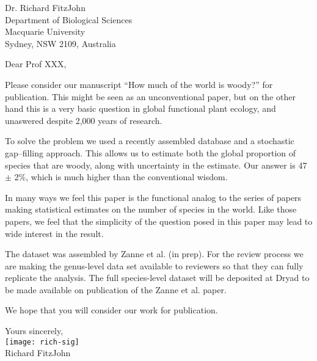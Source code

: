 \documentclass[a4paper,12pt]{article}
\begin{document}
{\raggedleft
  Dr. Richard FitzJohn\\
  Department of Biological Sciences\\
  Macquarie University\\
  Sydney, NSW 2109, Australia\\[2ex]
}

\vspace{3ex}

Dear Prof XXX,

Please consider our manuscript ``How much of the world is woody?''
for publication.  This might be seen as an unconventional paper, but
on the other hand this is a very basic question in global functional
plant ecology, and unaswered despite 2,000 years of research.

To solve the problem we used a recently assembled database and a
stochastic gap--filling approach.  This allows us to estimate both the
global proportion of species that are woody, along with uncertainty in
the estimate.  Our answer is 47 $\pm$ 2\%, which is much higher than
the conventional wisdom.

In many ways we feel this paper is the functional analog to the series
of papers making statistical estimates on the number of species in the
world.  Like those papers, we feel that the simplicity of the question
posed in this paper may lead to wide interest in the result.

The dataset was assembled by Zanne et al. (in prep).  For the review
process we are making the genus-level data set available to reviewers
so that they can fully replicate the analysis.  The full species-level
dataset will be deposited at Dryad to be made available on publication
of the Zanne et al. paper.

We hope that you will consider our work for publication.

\vspace{2ex}
\hspace{.2\textwidth}Yours sincerely,\\[2ex]
\hspace*{.2\textwidth}
\texttt{[image: rich-sig]}\\[2ex]
\hspace*{.3\textwidth}
Richard FitzJohn
\end{document}
